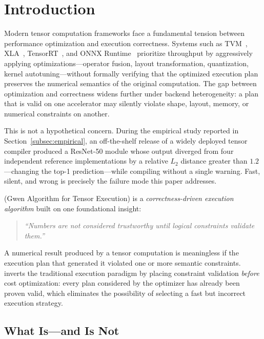 \section{Introduction}
\label{sec:introduction}

Modern tensor computation frameworks face a fundamental tension between
performance optimization and execution correctness. Systems such as
TVM~\cite{chen2018tvm}, XLA~\cite{xla2017}, TensorRT~\cite{tensorrt2020},
and ONNX Runtime~\cite{onnxruntime2019} prioritize throughput by
aggressively applying optimizations---operator fusion, layout
transformation, quantization, kernel autotuning---without formally
verifying that the optimized execution plan preserves the numerical
semantics of the original computation. The gap between optimization and
correctness widens further under backend heterogeneity: a plan that is
valid on one accelerator may silently violate shape, layout, memory, or
numerical constraints on another.

This is not a hypothetical concern. During the empirical study reported
in Section~\ref{subsec:empirical}, an off-the-shelf release of a widely
deployed tensor compiler produced a ResNet-50 module whose output
diverged from four independent reference implementations by a relative
$L_2$ distance greater than $1.2$---changing the top-1
prediction---while compiling without a single warning. Fast, silent, and
wrong is precisely the failure mode this paper addresses.

\gate{} (Gwen Algorithm for Tensor Execution) is a
\emph{correctness-driven execution algorithm} built on one foundational
insight:

\begin{quote}
\itshape ``Numbers are not considered trustworthy until logical
constraints validate them.''
\end{quote}

A numerical result produced by a tensor computation is meaningless if
the execution plan that generated it violated one or more semantic
constraints. \gate{} inverts the traditional execution paradigm by
placing constraint validation \emph{before} cost optimization: every
plan considered by the optimizer has already been proven valid, which
eliminates the possibility of selecting a fast but incorrect execution
strategy.

\subsection{What \gate{} Is---and Is Not}


